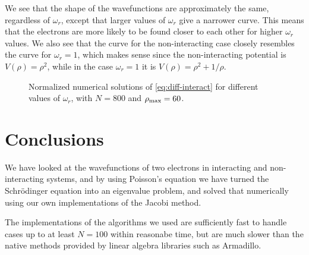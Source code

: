 \documentclass[11pt,a4paper]{article}
\begin{document}
We see that the shape of the wavefunctions are approximately the same, regardless of $\omega_r$, except that larger values of $\omega_r$ give a narrower curve. This means that the electrons are more likely to be found closer to each other for higher $\omega_r$ values. We also see that the curve for the non-interacting case closely resembles the curve for $\omega_r = 1$, which makes sense since the non-interacting potential is $V(\rho) = \rho^2$, while in the case $\omega_r = 1$ it is $V(\rho) = \rho^2 + 1 / \rho$.

\begin{figure}[!ht]
  \centering

  \caption{Normalized numerical solutions of \eqref{eq:diff-interact} for different values of $\omega_r$, with $N = 800$ and $\rho_{\rm max} = 60$.} \label{fig:d}
\end{figure}

\section{Conclusions}

We have looked at the wavefunctions of two electrons in interacting and non-interacting systems, and by using Poisson's equation we have turned the Schrödinger equation into an eigenvalue problem, and solved that numerically using our own implementations of the Jacobi method.

The implementations of the algorithms we used are sufficiently fast to handle cases up to at least $N = 100$ within reasonabe time, but are much slower than the native methods provided by linear algebra libraries such as Armadillo.
\end{document}

